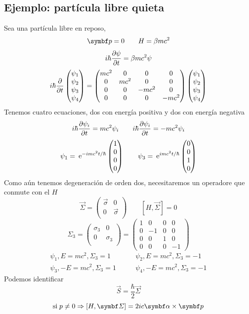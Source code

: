 \documentclass[10pt,oneside]{CBFT_book}
\begin{document}
\subsection{Ejemplo: partícula libre quieta}

Sea una partícula libre en reposo,
\[
	\vb{p} = 0 \qquad H=\beta m c^2
\]
\[
	i \hbar \frac{\partial^{\hspace{-0.05em}} {\psi}}{\partial {t}^{\hspace{-0.05em}}} = \beta m c^2 \psi
\]
\[
	i \hbar \frac{\partial^{\hspace{-0.05em}} {}}{\partial {t}^{\hspace{-0.05em}}} \begin{pmatrix} \psi_1 \\ \psi_2 \\ \psi_3 \\ \psi_4  \end{pmatrix} =
	\begin{pmatrix} mc^2 & 0 & 0 & 0 \\ 0 & mc^2 & 0 & 0 \\ 0 & 0 & -mc^2 & 0 \\ 0 & 0 & 0 & -mc^2 \end{pmatrix}
	\begin{pmatrix} \psi_1 \\ \psi_2 \\ \psi_3 \\ \psi_4  \end{pmatrix}
\]
Tenemos cuatro ecuaciones, dos con energía positiva y dos con energía negativa
\[
	i \hbar \frac{\partial^{\hspace{-0.05em}} {\psi_i}}{\partial {t}^{\hspace{-0.05em}}} = mc^2 \psi_i \qquad i \hbar \frac{\partial^{\hspace{-0.05em}} {\psi_i}}{\partial {t}^{\hspace{-0.05em}}} = -mc^2 \psi_i
\]
\[
	\psi_1 = \:\mathrm{e}^{-imc^2t/\hbar}\begin{pmatrix} 1 \\ 0 \\ 0 \\ 0  \end{pmatrix} \qquad 
	\psi_3 = \:\mathrm{e}^{imc^2t/\hbar}\begin{pmatrix} 0 \\ 0 \\ 1 \\ 0  \end{pmatrix}
\]
Como aún tenemos degeneración de orden dos, necesitaremos un operadore que conmute con el $H$
\[
	\vec{\Sigma} = \begin{pmatrix} \vec{\sigma} & 0 \\ 0 & \vec{\sigma} \\ \end{pmatrix} \qquad 
	[H,\vec{\Sigma}] = 0
\]
\[
	\Sigma_3 =  \begin{pmatrix} \sigma_3 & 0 \\ 0 & \sigma_3 \\ \end{pmatrix} = 
	\begin{pmatrix} 1 & 0 & 0 & 0 \\ 0 & -1 & 0 & 0 \\ 0 & 0 & 1 & 0 \\ 0 & 0 & 0 & -1 \end{pmatrix}
\]
\begin{align*}
	\psi_1, E=mc^2, \Sigma_3=1 \qquad  &\psi_2, E=mc^2, \Sigma_3=-1 \\
	\psi_3, -E=mc^2, \Sigma_3=1 \qquad  &\psi_4, -E=mc^2, \Sigma_3=-1
\end{align*}
Podemos identificar 
\[
	\vec{S} = \frac{\hbar}{2} \vec{\Sigma}
\]
\[
	\text{si} \; p \neq 0  \Rightarrow [H, \vb{\Sigma}] = 2ic \vb{\alpha} \times \vb{p}
\]
\end{document}
